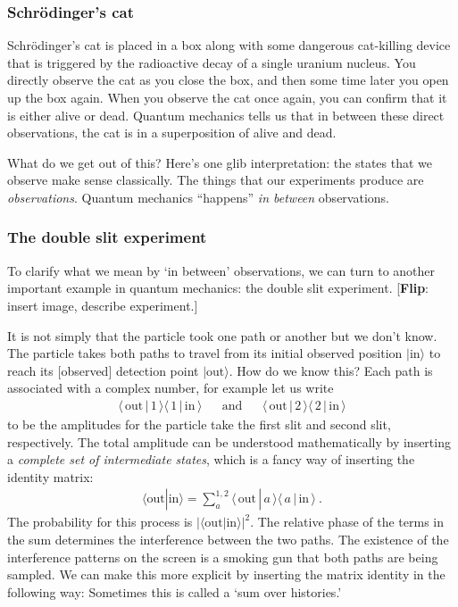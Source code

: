 \documentclass[12pt]{article}
\numberwithin{equation}{section}    %
\newcommand{\flip}[1]{{
	\color{green!50!black} \footnotesize [\textbf{\textsf{Flip}}: \textsf{#1}]
	}}
\theoremstyle{definition}
\begin{document}
\subsubsection{Schr\"odinger's cat}

Schr\"odinger's cat is placed in a box along with some dangerous cat-killing device that is triggered by the radioactive decay of a single uranium nucleus. You directly observe the cat as you close the box, and then some time later you open up the box again. When you observe the cat once again, you can confirm that it is either alive or dead. Quantum mechanics tells us that in between these direct observations, the cat  is in a superposition of alive and dead.

What do we get out of this? Here's one glib interpretation: the states that we observe make sense classically. The things that our experiments produce are \emph{observations}. Quantum mechanics ``happens'' \emph{in between} observations. 

\subsubsection{The double slit experiment}

To clarify what we mean by `in between' observations, we can turn to another important example in quantum mechanics: the double slit experiment. \flip{insert image, describe experiment.}

It is not simply that the particle took one path or another but we don't know.
%
The particle takes both paths to travel from its initial observed position $|\text{in}\rangle$ to reach its [observed] detection point $|\text{out}\rangle$. 
%
How do we know this? Each path is associated with a complex number, for example let us write
\begin{align}
		\langle \,\text{out}\, |  \,1 \,\rangle
		\langle \, 1\, |  \,\text{in} \,\rangle
		&&
		\text{and}
		&&
		\langle \,\text{out}\, |  \,2 \,\rangle
		\langle \, 2\, |  \,\text{in} \,\rangle
\end{align}
to be the amplitudes for the particle take the first slit and second slit, respectively.  The total amplitude can be understood mathematically by inserting a \emph{complete set of intermediate states}, which is a fancy way of inserting the identity matrix:
\begin{align}
	\langle \text{out} | \text{in}\rangle
	 = 
	\sum_{a}^{1,2}
	\langle \,\text{out}\, |  \, a \,\rangle
		\langle \, a\, |  \,\text{in} \,\rangle \ .
	\label{eq:double:slit:sum}
\end{align}
The probability for this process is $|\langle \text{out} | \text{in}\rangle|^2$. The relative phase of the terms in the sum determines the interference between the two paths. The existence of the interference patterns on the screen is a smoking gun that both paths are being sampled.
%
We can make this more explicit by inserting the matrix identity in the following way:
%
Sometimes this is called a `sum over histories.'  
\end{document}
